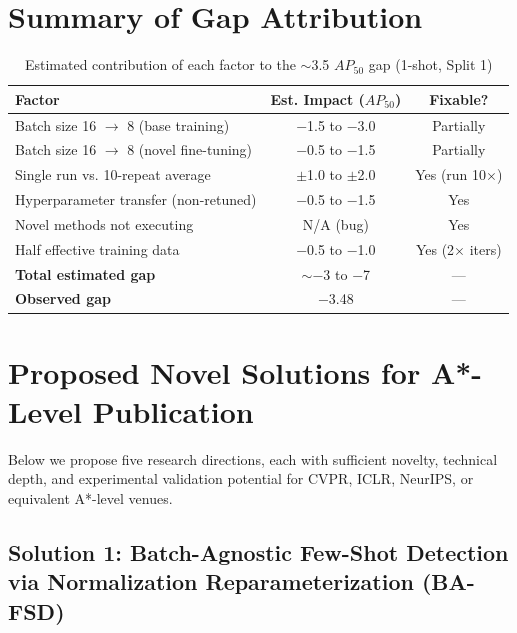 \documentclass[11pt,a4paper]{article}
\begin{document}
\section{Summary of Gap Attribution}

\begin{table}[h]
\centering
\caption{Estimated contribution of each factor to the $\sim$3.5 $AP_{50}$ gap (1-shot, Split 1)}
\begin{tabular}{lcc}
\toprule
\textbf{Factor} & \textbf{Est. Impact ($AP_{50}$)} & \textbf{Fixable?} \\
\midrule
Batch size 16 $\rightarrow$ 8 (base training) & $-$1.5 to $-$3.0 & Partially \\
Batch size 16 $\rightarrow$ 8 (novel fine-tuning) & $-$0.5 to $-$1.5 & Partially \\
Single run vs. 10-repeat average & $\pm$1.0 to $\pm$2.0 & Yes (run 10$\times$) \\
Hyperparameter transfer (non-retuned) & $-$0.5 to $-$1.5 & Yes \\
Novel methods not executing & N/A (bug) & Yes \\
Half effective training data & $-$0.5 to $-$1.0 & Yes (2$\times$ iters) \\
\midrule
\textbf{Total estimated gap} & $\sim$$-$3 to $-$7 & --- \\
\textbf{Observed gap} & $-$3.48 & --- \\
\bottomrule
\end{tabular}
\end{table}

\section{Proposed Novel Solutions for A*-Level Publication}

Below we propose five research directions, each with sufficient novelty, technical depth, and experimental validation potential for CVPR, ICLR, NeurIPS, or equivalent A*-level venues.

\subsection{Solution 1: Batch-Agnostic Few-Shot Detection via Normalization Reparameterization (BA-FSD)}
\end{document}
